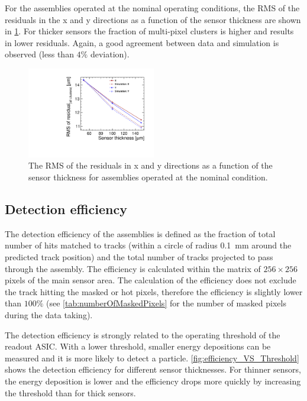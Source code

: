 For the assemblies operated at the nominal operating conditions, the
RMS of the residuals in the x and y directions as a function of the
sensor thickness are shown in \cref{fig:residuals_thickness}. For
thicker sensors the fraction of multi-pixel clusters is higher and
results in lower residuals. Again, a good agreement between data and
simulation is observed (less than $4\%$ deviation).

\begin{figure}[htbp] 
  \centering
  \includegraphics[width=0.5\textwidth]{./figures/TestBeam/residuals_vs_thickness.pdf}
  \caption{The RMS of the residuals in x and y directions as a
    function of the sensor thickness for assemblies operated at the
    nominal condition.}
  \label{fig:residuals_thickness}
\end{figure}



\subsection{Detection efficiency}

The detection efficiency of the assemblies is defined as the fraction
of total number of hits matched to tracks (within a circle of radius
0.1~mm around the predicted track position) and the total number of
tracks projected to pass through the assembly. The efficiency is
calculated within the matrix of $256\times256$ pixels of the main
sensor area. The calculation of the efficiency does not exclude the
track hitting the masked or hot pixels, therefore the efficiency is
slightly lower than $100\%$ (see \cref{tab:numberOfMaskedPixels} for
the number of masked pixels during the data taking).

The detection efficiency is strongly related to the operating
threshold of the readout ASIC. With a lower threshold, smaller energy
depositions can be measured and it is more likely to detect a
particle. \cref{fig:efficiency_VS_Threshold} shows the detection
efficiency for different sensor thicknesses. For thinner sensors, the
energy deposition is lower and the efficiency drops more quickly by
increasing the threshold than for thick sensors.

